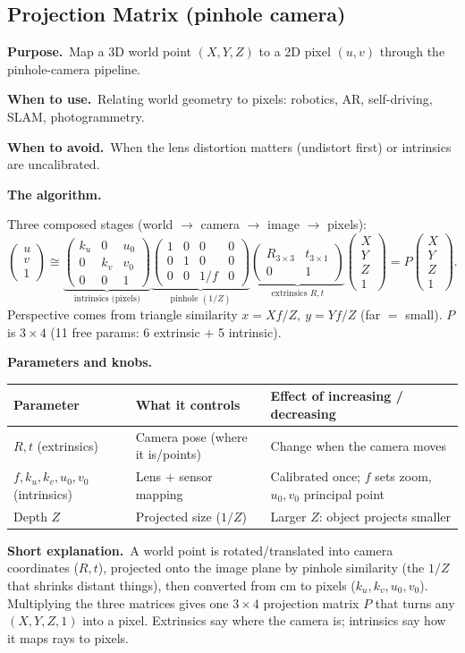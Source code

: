\documentclass[10pt]{article}
\makeatletter
\newcommand{\Purpose}{\par\smallskip\textbf{Purpose.}\ }
\newcommand{\WhenUse}{\par\textbf{When to use.}\ }
\newcommand{\WhenAvoid}{\par\textbf{When to avoid.}\ }
\newcommand{\TheAlgo}{\par\smallskip\textbf{The algorithm.}\par\nopagebreak}
\newcommand{\Knobs}{\par\smallskip\textbf{Parameters and knobs.}\par\nopagebreak}
\newcommand{\ShortExp}{\par\smallskip\textbf{Short explanation.}\ }
\newenvironment{ptable}{\begin{center}\small\begin{tabular}{@{}p{2.5cm} p{5.9cm} p{6.2cm}@{}}\toprule
Parameter & What it controls & Effect of increasing / decreasing \\ \midrule}
{\bottomrule\end{tabular}\end{center}}
\makeatother
\begin{document}
\subsection{Projection Matrix (pinhole camera)}
\Purpose Map a 3D world point $(X,Y,Z)$ to a 2D pixel $(u,v)$ through the pinhole-camera pipeline.
\WhenUse Relating world geometry to pixels: robotics, AR, self-driving, SLAM, photogrammetry.
\WhenAvoid When the lens distortion matters (undistort first) or intrinsics are uncalibrated.
\TheAlgo Three composed stages (world $\to$ camera $\to$ image $\to$ pixels):
\[
\begin{pmatrix}u\\v\\1\end{pmatrix}\cong
\underbrace{\begin{pmatrix}k_u&0&u_0\\0&k_v&v_0\\0&0&1\end{pmatrix}}_{\text{intrinsics (pixels)}}
\underbrace{\begin{pmatrix}1&0&0&0\\0&1&0&0\\0&0&1/f&0\end{pmatrix}}_{\text{pinhole }(1/Z)}
\underbrace{\begin{pmatrix}R_{3\times3}&t_{3\times1}\\0&1\end{pmatrix}}_{\text{extrinsics }R,t}
\begin{pmatrix}X\\Y\\Z\\1\end{pmatrix}=P\begin{pmatrix}X\\Y\\Z\\1\end{pmatrix}.
\]
Perspective comes from triangle similarity $x=Xf/Z,\ y=Yf/Z$ (far $=$ small). $P$ is $3\times4$ (11 free
params: 6 extrinsic $+$ 5 intrinsic).
\Knobs
\begin{ptable}
$R,t$ (extrinsics) & Camera pose (where it is/points) & Change when the camera moves \\
$f,k_u,k_v,u_0,v_0$ (intrinsics) & Lens $+$ sensor mapping & Calibrated once; $f$ sets zoom, $u_0,v_0$ principal point \\
Depth $Z$ & Projected size ($1/Z$) & Larger $Z$: object projects smaller \\
\end{ptable}
\ShortExp A world point is rotated/translated into camera coordinates ($R,t$), projected onto the image
plane by pinhole similarity (the $1/Z$ that shrinks distant things), then converted from cm to pixels
($k_u,k_v,u_0,v_0$). Multiplying the three matrices gives one $3\times4$ projection matrix $P$ that turns
any $(X,Y,Z,1)$ into a pixel. Extrinsics say where the camera is; intrinsics say how it maps rays to pixels.
\end{document}

